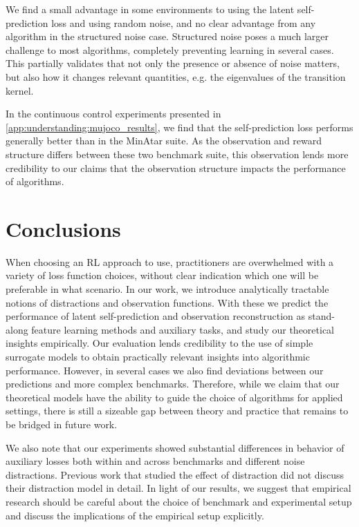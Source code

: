 We find a small advantage in some environments to using the latent self-prediction loss and using random noise, and no clear advantage from any algorithm in the structured noise case.
Structured noise poses a much larger challenge to most algorithms, completely preventing learning in several cases.
This partially validates that not only the presence or absence of noise matters, but also how it changes relevant quantities, e.g. the eigenvalues of the transition kernel.

In the continuous control experiments presented in \autoref{app:understanding:mujoco_results}, we find that the self-prediction loss performs generally better than in the MinAtar suite.
As the observation and reward structure differs between these two benchmark suite, this observation lends more credibility to our claims that the observation structure impacts the performance of algorithms.

\section{Conclusions}

When choosing an RL approach to use, practitioners are overwhelmed with a variety of loss function choices, without clear indication which one will be preferable in what scenario.
In our work, we introduce analytically tractable notions of distractions and observation functions.
With these we predict the performance of latent self-prediction and observation reconstruction as stand-along feature learning methods and auxiliary tasks, and study our theoretical insights empirically.
Our evaluation lends credibility to the use of simple surrogate models to obtain practically relevant insights into algorithmic performance.
However, in several cases we also find deviations between our predictions and more complex benchmarks.
Therefore, while we claim that our theoretical models have the ability to guide the choice of algorithms for applied settings, there is still a sizeable gap between theory and practice that remains to be bridged in future work.

We also note that our experiments showed substantial differences in behavior of auxiliary losses both within and across benchmarks and different noise distractions.
Previous work that studied the effect of distraction \parencite{nikishin2021control,voelcker2022value,ni2024bridging} did not discuss their distraction model in detail. 
In light of our results, we suggest that empirical research should be careful about the choice of benchmark and experimental setup and discuss the implications of the empirical setup explicitly.

